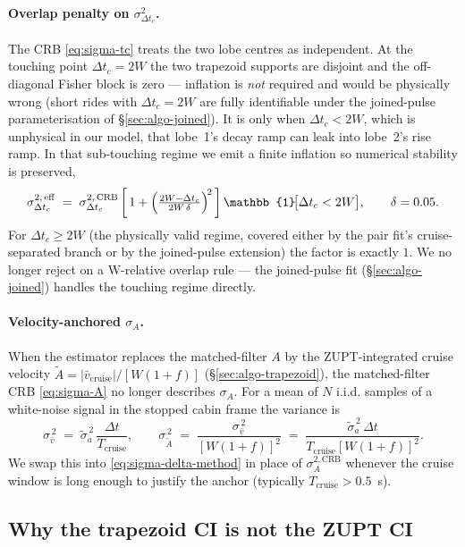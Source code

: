 \paragraph{Overlap penalty on $\sigma_{\Delta t_c}^2$.} The CRB
\eqref{eq:sigma-tc} treats the two lobe centres as independent.
At the touching point $\Delta t_c = 2W$ the two trapezoid supports
are disjoint and the off-diagonal Fisher block is zero — inflation
is \emph{not} required and would be physically wrong (short rides
with $\Delta t_c=2W$ are fully identifiable under the joined-pulse
parameterisation of \S\ref{sec:algo-joined}). It is only when
$\Delta t_c < 2W$, which is unphysical in our model, that lobe~1's
decay ramp can leak into lobe~2's rise ramp. In that sub-touching
regime we emit a finite inflation so numerical stability is
preserved,
\begin{equation}
  \sigma_{\Delta t_c}^{2,\,\mathrm{eff}}
  \;=\;
  \sigma_{\Delta t_c}^{2,\,\mathrm{CRB}}\,
  \biggl[\,1 + \Bigl(\tfrac{2W-\Delta t_c}{2W\,\delta}\Bigr)^{\!2}\,\biggr]\,
  \mathbb{1}\!\bigl[\Delta t_c < 2W\bigr],
  \qquad \delta = 0.05.
  \label{eq:overlap-inflation}
\end{equation}
For $\Delta t_c \ge 2W$ (the physically valid regime, covered either
by the pair fit's cruise-separated branch or by the joined-pulse
extension) the factor is exactly $1$. We no longer reject on a
W-relative overlap rule — the joined-pulse fit
(\S\ref{sec:algo-joined}) handles the touching regime directly.

\paragraph{Velocity-anchored $\sigma_A$.} When the estimator replaces
the matched-filter $A$ by the ZUPT-integrated cruise velocity
$\widetilde A = |\bar v_\mathrm{cruise}|/[W(1+f)]$
(\S\ref{sec:algo-trapezoid}), the matched-filter CRB
\eqref{eq:sigma-A} no longer describes $\sigma_A$. For a mean of
$N$ i.i.d. samples of a white-noise signal in the stopped cabin frame
the variance is
\[
  \sigma_{\bar v}^{\,2} \;=\; \tilde{\sigma}_a^{\,2}\,\frac{\Delta t}{T_\mathrm{cruise}},
  \qquad
  \sigma_{\widetilde A}^{\,2} \;=\; \frac{\sigma_{\bar v}^{\,2}}{[W(1+f)]^2}
  \;=\; \frac{\tilde\sigma_a^{\,2}\,\Delta t}{T_\mathrm{cruise}[W(1+f)]^2}.
\]
We swap this into \eqref{eq:sigma-delta-method} in place of
$\sigma_A^{2,\mathrm{CRB}}$ whenever the cruise window is long enough
to justify the anchor (typically $T_\mathrm{cruise} > 0.5$~s).

\subsection{Why the trapezoid CI is not the ZUPT CI}
\label{sec:trap-vs-zupt-sigma}

